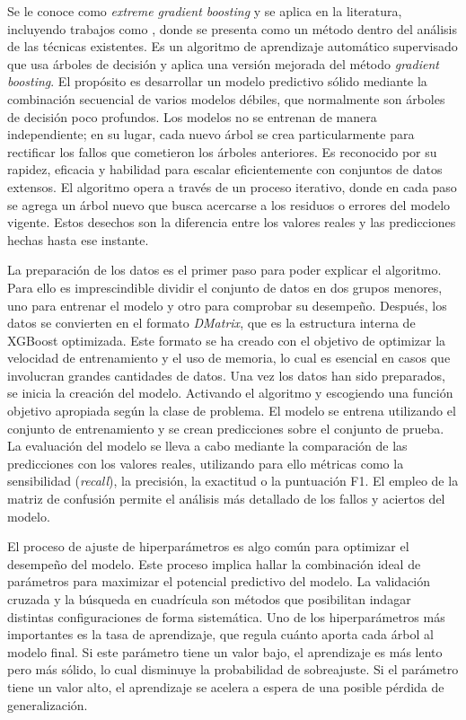 \documentclass[12pt,a4paper]{report}
\begin{document}
Se le conoce como \emph{extreme gradient boosting} y se aplica en la literatura, incluyendo trabajos como \cite{articulo3}, donde se presenta como un método dentro del análisis de las técnicas existentes. Es un algoritmo de aprendizaje automático supervisado que usa árboles de decisión y aplica una versión mejorada del método \emph{gradient boosting}. El propósito es desarrollar un modelo predictivo sólido mediante la combinación secuencial de varios modelos débiles, que normalmente son árboles de decisión poco profundos. Los modelos no se entrenan de manera independiente; en su lugar, cada nuevo árbol se crea particularmente para rectificar los fallos que cometieron los árboles anteriores. Es reconocido por su rapidez, eficacia y habilidad para escalar eficientemente con conjuntos de datos extensos. El algoritmo opera a través de un proceso iterativo, donde en cada paso se agrega un árbol nuevo que busca acercarse a los residuos o errores del modelo vigente. Estos desechos son la diferencia entre los valores reales y las predicciones hechas hasta ese instante.

La preparación de los datos es el primer paso para poder explicar el algoritmo. Para ello es imprescindible dividir el conjunto de datos en dos grupos menores, uno para entrenar el modelo y otro para comprobar su desempeño. Después, los datos se convierten en el formato \emph{DMatrix}, que es la estructura interna de XGBoost optimizada. Este formato se ha creado con el objetivo de optimizar la velocidad de entrenamiento y el uso de memoria, lo cual es esencial en casos que involucran grandes cantidades de datos. Una vez los datos han sido preparados, se inicia la creación del modelo. Activando el algoritmo y escogiendo una función objetivo apropiada según la clase de problema. El modelo se entrena utilizando el conjunto de entrenamiento y se crean predicciones sobre el conjunto de prueba. La evaluación del modelo se lleva a cabo mediante la comparación de las predicciones con los valores reales, utilizando para ello métricas como la sensibilidad (\emph{recall}), la precisión, la exactitud o la puntuación F1. El empleo de la matriz de confusión permite el análisis más detallado de los fallos y aciertos del modelo.

El proceso de ajuste de hiperparámetros es algo común para optimizar el desempeño del modelo. Este proceso implica hallar la combinación ideal de parámetros para maximizar el potencial predictivo del modelo. La validación cruzada y la búsqueda en cuadrícula son métodos que posibilitan indagar distintas configuraciones de forma sistemática. Uno de los hiperparámetros más importantes es la tasa de aprendizaje, que regula cuánto aporta cada árbol al modelo final. Si este parámetro tiene un valor bajo, el aprendizaje es más lento pero más sólido, lo cual disminuye la probabilidad de sobreajuste. Si el parámetro tiene un valor alto, el aprendizaje se acelera a espera de una posible pérdida de generalización.
\end{document}
